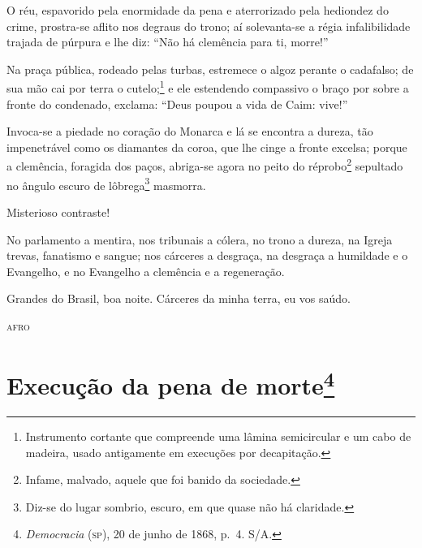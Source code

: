 O réu, espavorido pela enormidade da pena e aterrorizado pela hediondez
do crime, prostra-se aflito nos degraus do trono; aí solevanta-se a
régia infalibilidade trajada de púrpura e lhe diz: ``Não há clemência
para ti, morre!''

Na praça pública, rodeado pelas turbas, estremece o algoz perante o
cadafalso; de sua mão cai por terra o cutelo;\footnote{Instrumento
  cortante que compreende uma lâmina semicircular e um cabo de madeira,
  usado antigamente em execuções por decapitação.} e ele estendendo
compassivo o braço por sobre a fronte do condenado, exclama: ``Deus
poupou a vida de Caim: vive!''

Invoca-se a piedade no coração do Monarca e lá se encontra a dureza, tão
impenetrável como os diamantes da coroa, que lhe cinge a fronte excelsa;
porque a clemência, foragida dos paços, abriga-se agora no peito do
réprobo\footnote{Infame, malvado, aquele que foi banido da sociedade.}
sepultado no ângulo escuro de lôbrega\footnote{Diz-se do lugar
  sombrio, escuro, em que quase não há claridade.} masmorra.

Misterioso contraste!

No parlamento a mentira, nos tribunais a cólera, no trono a dureza, na
Igreja trevas, fanatismo e sangue; nos cárceres a desgraça, na desgraça
a humildade e o Evangelho, e no Evangelho a clemência e a regeneração.

Grandes do Brasil, boa noite. Cárceres da minha terra, eu vos saúdo.

\begin{flushright}
\textsc{afro}
\end{flushright}


\chapter{Execução da pena de morte\footnote{\emph{Democracia} (\textsc{sp}),
  20 de junho de 1868, p.~4. S/A.}}

